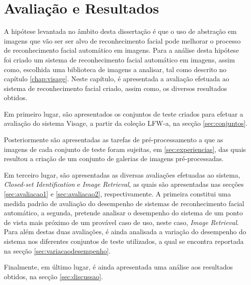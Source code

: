 \chapter{Avaliação e Resultados} \label{chap:resultados}

A hipótese levantada no âmbito desta dissertação é que o uso de abstração em imagens que vão ser ser alvo de reconhecimento facial pode melhorar o processo de reconhecimento facial automático em imagens. Para a análise desta hipótese foi criado um sistema de reconhecimento facial automático em imagens, assim  como, escolhida uma biblioteca de imagens a analisar, tal como descrito no capítulo \ref{chap:visage}. Neste capítulo, é apresentada a avaliação efetuada ao sistema de reconhecimento facial criado, assim como, os diversos resultados obtidos. 

Em primeiro lugar, são apresentados os conjuntos de teste criados para efetuar a avaliação do sistema Visage, a partir da coleção LFW-a, na secção \ref{sec:conjuntos}.

Posteriormente são apresentadas as tarefas de pré-processamento a que as imagens de cada conjunto de teste foram sujeitas, em \ref{sec:experiencias}, das quais resultou a criação de um conjunto de galerias de imagens pré-processadas. 

Em terceiro lugar, são apresentadas as diversas avaliações efetuadas ao sistema, \textit{Closed-set Identification} e \textit{Image Retrieval}, as quais são apresentadas nas secções \ref{sec:avaliacao1} e \ref{sec:avaliacao2}, respectivamente. A primeira constitui uma medida padrão de avaliação do desempenho de sistemas de reconhecimento facial automático, a segunda, pretende analisar o desempenho do sistema de um ponto de vista mais próximo de um provável caso de uso, neste caso, \textit{Image Retrieval}. Para além destas duas avaliações, é ainda analisada a variação do desempenho do sistema nos diferentes conjuntos de teste utilizados, a qual se encontra reportada na secção \ref{sec:variacaodesempenho}.

Finalmente, em último lugar, é ainda apresentada uma análise aos resultados obtidos, na secção \ref{sec:discussao}.

